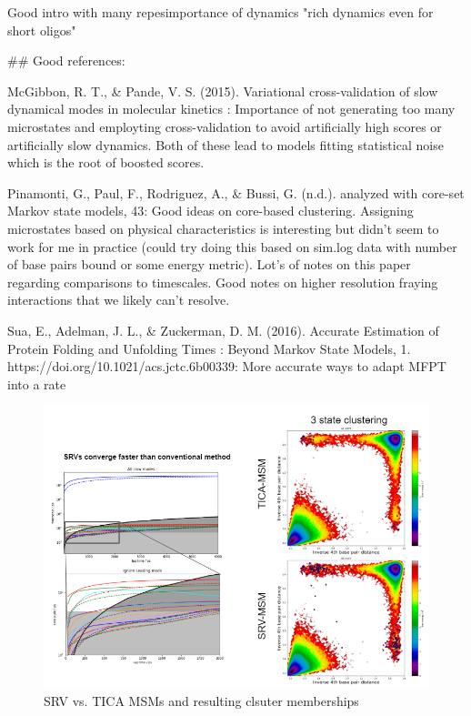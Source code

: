 \documentclass[journal=jpcbfk,manuscript=article]{achemso}
\begin{document}
\citep{Sanstead2018DirectDehybridization} Good intro with many repesimportance of dynamics "rich dynamics even for short oligos"


## Good references:

McGibbon, R. T., & Pande, V. S. (2015). Variational cross-validation of slow dynamical modes in molecular kinetics : Importance of not generating too many microstates and employting cross-validation to avoid artificially high scores or artificially slow dynamics. Both of these lead to models fitting statistical noise which is the root of boosted scores.

Pinamonti, G., Paul, F., Rodriguez, A., & Bussi, G. (n.d.). analyzed with core-set Markov state models, 43: Good ideas on core-based clustering. Assigning microstates based on physical characteristics is interesting but didn't seem to work for me in practice (could try doing this based on sim.log data with number of base pairs bound or some energy metric). Lot's of notes on this paper regarding comparisons to timescales. Good notes on higher resolution fraying interactions that we likely can't resolve.

Sua, E., Adelman, J. L., & Zuckerman, D. M. (2016). Accurate Estimation of Protein Folding and Unfolding Times : Beyond Markov State Models, 1. https://doi.org/10.1021/acs.jctc.6b00339:
More accurate ways to adapt MFPT into a rate


\begin{figure}[ht!]
	\begin{center}
        \includegraphics[width=\textwidth]{Figs/skeleton/tica_comparison_GC-core.PNG}
        \caption{SRV vs. TICA MSMs and resulting clsuter memberships}
        \label{fig:tica_comparison}
	\end{center}
\end{figure}
\end{document}
